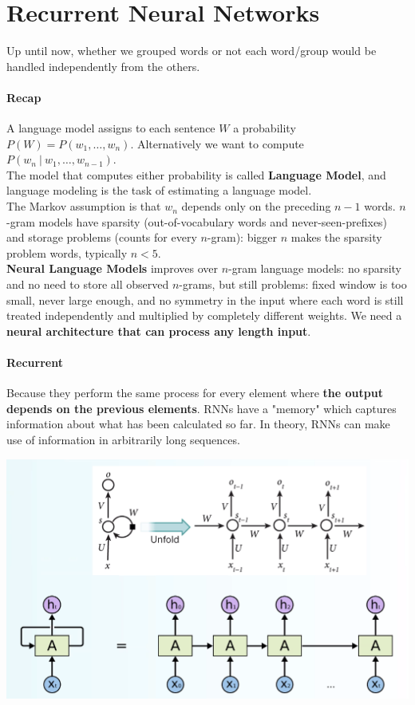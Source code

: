 \documentclass[10pt]{report}
\begin{document}
\section{Recurrent Neural Networks}
Up until now, whether we grouped words or not each word/group would be handled independently from the others.
\paragraph{Recap} A language model assigns to each sentence $W$ a probability $P(W) = P(w_1,\ldots,w_n)$. Alternatively we want to compute $P(w_n\:|\:w_1,\ldots,w_{n-1})$.\\
The model that computes either probability is called \textbf{Language Model}, and language modeling is the task of estimating a language model.\\
The Markov assumption is that $w_n$ depends only on the preceding $n-1$ words. $n$-gram models have sparsity (out-of-vocabulary words and never-seen-prefixes) and storage problems (counts for every $n$-gram): bigger $n$ makes the sparsity problem words, typically $n<5$.\\
\textbf{Neural Language Models} improves over $n$-gram language models: no sparsity and no need to store all observed $n$-grams, but still problems: fixed window is too small, never large enough, and no symmetry in the input where each word is still treated independently and multiplied by completely different weights. We need a \textbf{neural architecture that can process any length input}.
\paragraph{Recurrent} Because they perform the same process for every element where \textbf{the output depends on the previous elements}. RNNs have a "memory" which captures information about what has been calculated so far. In theory, RNNs can make use of information in arbitrarily long sequences.
\begin{center}
	\includegraphics[scale=0.5]{24.png}
\end{center}
\end{document}
